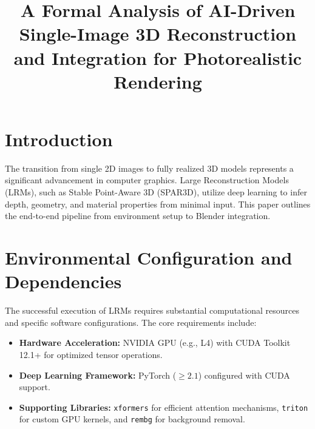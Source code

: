\documentclass[10pt,journal,compsoc]{IEEEtran}
\begin{document}
\title{A Formal Analysis of AI-Driven Single-Image 3D Reconstruction and Integration for Photorealistic Rendering}


\maketitle
\IEEEdisplaynontitleabstractindextext
\IEEEpeerreviewmaketitle


\newtheorem{theorem}{Theorem}
\newtheorem{lemma}{Lemma}
\newtheorem{definition}{Definition}

\section{Introduction}
The transition from single 2D images to fully realized 3D models represents a significant advancement in computer graphics. Large Reconstruction Models (LRMs), such as Stable Point-Aware 3D (SPAR3D), utilize deep learning to infer depth, geometry, and material properties from minimal input. This paper outlines the end-to-end pipeline from environment setup to Blender integration.

\section{Environmental Configuration and Dependencies}
The successful execution of LRMs requires substantial computational resources and specific software configurations. The core requirements include:
\begin{itemize}
    \item \textbf{Hardware Acceleration:} NVIDIA GPU (e.g., L4) with CUDA Toolkit 12.1+ for optimized tensor operations.
    \item \textbf{Deep Learning Framework:} PyTorch ($\ge 2.1$) configured with CUDA support.
    \item \textbf{Supporting Libraries:} \texttt{xformers} for efficient attention mechanisms, \texttt{triton} for custom GPU kernels, and \texttt{rembg} for background removal.
\end{itemize}
\end{document}
